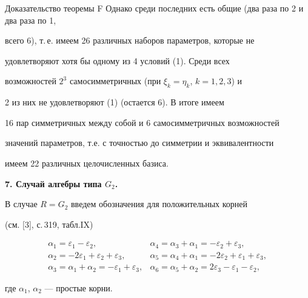 \begin{pf*}{Доказательство теоремы F}
Однако среди последних есть общие (два раза по 2 и два раза по 1,


всего 6), т.\,е. имеем 26 различных наборов параметров, которые не


удовлетворяют хотя бы одному из 4 условий (1). Среди  всех


возможностей $2^3$ самосимметричных (при $\xi_k=\eta_k$, $k=1,2,3$) и


2 из них не удовлетворяют (1) (остается 6). В итоге имеем


16 пар симметричных между собой и 6 самосимметричных возможностей


значений параметров, т.е. с точностью до симметрии и эквивалентности


имеем 22 различных целочисленных базиса.


\end{pf*}





{\bf 7. Случай алгебры типа $G_2$.}


В случае $R=G_2$ введем обозначения для положительных корней


(см. [3], с.\,319, табл.\;IX)


$$


\begin{array}{l|l}


\alpha_1=\varepsilon_1-\varepsilon_2, &


\alpha_4=\alpha_3+\alpha_1=-\varepsilon_2+\varepsilon_3,\\


\alpha_2=-2\varepsilon_1+\varepsilon_2+\varepsilon_3, &


\alpha_5=\alpha_4+\alpha_1=-2\varepsilon_2+\varepsilon_1+\varepsilon_3,\\


\alpha_3=\alpha_1+\alpha_2=-\varepsilon_1+\varepsilon_3, &


\alpha_6=\alpha_5+\alpha_2=2\varepsilon_3-\varepsilon_1-\varepsilon_2,


\end{array}


$$


где $\alpha_1$, $\alpha_2$ --- простые корни.





